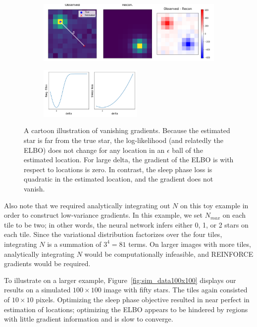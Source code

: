 \begin{figure}[!htb]
    \centering
    \begin{subfigure}[t]{0.8\textwidth}
    \centering
    \includegraphics[width=\textwidth]{figures/gradzero_cartoon.png}
    \end{subfigure}
    \begin{subfigure}[t]{\textwidth}
    \centering
    \includegraphics[width=0.55\textwidth]{figures/gradzero_cartoon2.png}
    \end{subfigure}
    \vspace{-3em}
    \caption{A cartoon illustration of vanishing gradients. Because the estimated star is far from the true star, the log-likelihood (and relatedly the ELBO) does not change for any location in an $\epsilon$ ball of the estimated location. 
    For large delta, the gradient of the ELBO is with respect to locations is zero. In contrast, the sleep phase loss is quadratic in the estimated location, and the gradient does not vanish. }
    \label{fig:gradzero_cartoon}
\end{figure}

Also note that we required analytically integrating out $N$ on this toy example in order to construct low-variance gradients. 
In this example, we set $N_{max}$ on each tile to be two; in other words, the neural network infers either 0, 1, or 2 stars on each tile.
Since the variational distribution factorizes over the four tiles, integrating $N$ is a summation of $3^4 = 81$ terms.
On larger images with more tiles, analytically integrating $N$ would be computationally infeasible, and REINFORCE gradients would be required. 

To illustrate on a larger example, Figure~\ref{fig:sim_data100x100} displays our results on a simulated $100\times 100$ image with fifty stars. The tiles again consisted of $10\times 10$ pixels. Optimizing the sleep phase objective resulted in near perfect in estimation of locations; optimizing the ELBO appears to be hindered by regions with little gradient information and is slow to converge. 

